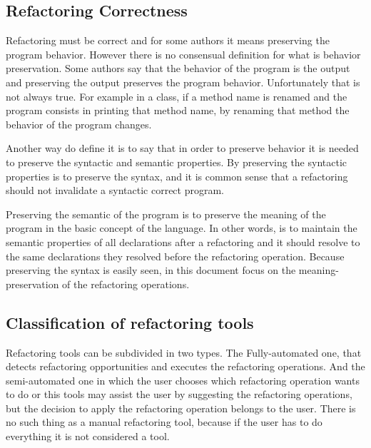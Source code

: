 \subsection{Refactoring Correctness}
Refactoring must be correct and for some authors it means preserving the program behavior. %
However there is no consensual definition for what is behavior preservation.
Some authors say that the behavior of the program is the output and preserving the output preserves the program behavior. 
Unfortunately that is not always true. \cite{erb2010survey} 
For example in a class, if a method name is renamed and the program consists in printing that method name, by renaming that method the behavior of the program changes.

Another way do define it is to say that in order to preserve behavior it is needed to preserve the syntactic and semantic properties.
By preserving the syntactic properties is to preserve the syntax, and it is common sense that a refactoring should not invalidate a syntactic correct program.

Preserving the semantic of the program is to preserve the meaning of the program in the basic concept of the language. 
In other words, is to  maintain the semantic properties of all declarations after a refactoring and it should resolve to the same declarations they resolved before the refactoring operation.
Because preserving the syntax is easily seen, in this document focus on the meaning-preservation of the refactoring operations. 






\subsection{Classification of refactoring tools} %
Refactoring tools can be subdivided in two types.
The Fully-automated one, that detects refactoring opportunities and executes the refactoring operations. And the semi-automated one in which the user chooses which refactoring operation wants to do or this tools may assist the user by suggesting the refactoring operations, but the decision to apply the refactoring operation belongs to the user. \cite{erb2010survey}
There is no such thing as a manual refactoring tool, because if the user has to do everything it is not considered a tool.


